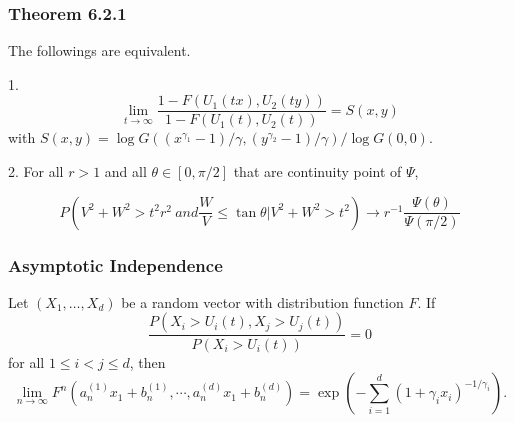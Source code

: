 \documentclass{beamer}
\newcommand{\suit}[1]{\left(#1\right)}
\begin{document}
\begin{frame}
    \frametitle{Theorem 6.2.1}
The followings are equivalent.

1. 
$$
\lim_{t\to \infty} \dfrac{1-F(U_1(tx),U_2(ty))}{1-F(U_1(t),U_2(t))}=S(x,y)
$$
with $S(x,y)=\log G((x^{\gamma_1}-1)/\gamma,(y^{\gamma_2}-1)/\gamma)/\log G(0,0)$.

2. For all $r>1$ and all $\theta \in [0,\pi/2]$ that   are continuity point of $\Psi$,

$$
P\suit{V^2+W^2>t^2r^2\ and \frac{W}{V}\le \tan \theta | V^2+W^2>t^2}\to r^{-1}\frac{\Psi(\theta)}{\Psi(\pi/2)}
$$
\end{frame}




\begin{frame}
    \frametitle{Asymptotic Independence}

    Let $(X_1,\dots,X_d)$  be a random vector with distribution function  $F$. If
    $$
    \dfrac{P(X_i>U_i(t),X_j>U_j(t))}{P(X_i>U_i(t))}=0
    $$
    for all $1\le i<j\le d$, then 
    $$
\lim_{n \to \infty} F^n(a_n^{(1)}x_1+b_n^{(1)},\cdots, a_n^{(d)}x_1+b_n^{(d)})=\exp\suit{-\sum_{i=1}^d (1+\gamma_ix_i)^{-1/\gamma_i}}.
    $$

\end{frame}
\end{document}
